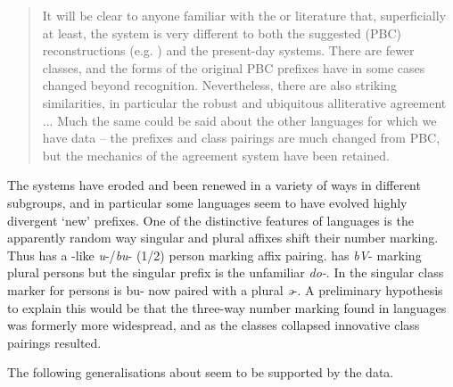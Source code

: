 \documentclass[output=paper]{langsci/langscibook}
\begin{document}
\begin{quote}
{It will be clear to anyone familiar with the  or  literature that, superficially at least, the  system is very different to both the suggested  (PBC) reconstructions (e.g.  \citealt{deWolf1971}) and the present-day  systems. There are fewer classes, and the forms of the original PBC prefixes have in some cases changed beyond recognition. Nevertheless, there are also striking similarities, in particular the robust and ubiquitous alliterative agreement ... Much the same could be said about the other  languages for which we have data – the prefixes and class pairings are much changed from PBC, but the mechanics of the agreement system have been retained.}
\end{quote}

The systems have eroded and been renewed in a variety of ways in different subgroups, and in particular some languages seem to have evolved highly divergent ‘new’ prefixes. One of the distinctive features of  languages is the apparently random way singular and plural affixes shift their number marking. Thus  has a -like\textit{ u}-/\textit{bu}- (1/2) person marking affix pairing.  has \textit{bV}- marking plural persons but the singular prefix is the unfamiliar \textit{do-}. In  the singular class marker for persons is bu- now paired with a plural \textit{ə}-. A preliminary hypothesis to explain this would be that the three-way number marking found in  languages was formerly more widespread, and as the classes collapsed innovative class pairings resulted.

The following generalisations about  seem to be supported by the data.
\end{document}

